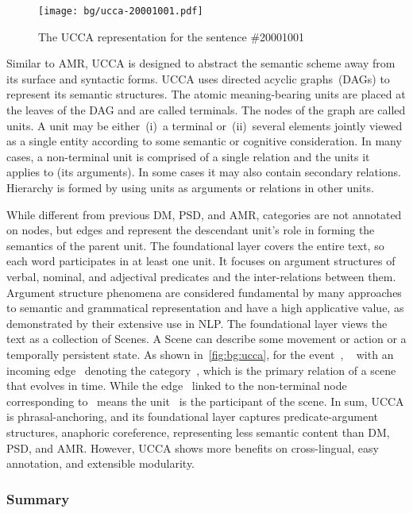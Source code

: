 \begin{figure}[!tbp]
\centering
\texttt{[image: bg/ucca-20001001.pdf]}
\caption{\label{fig:bg:ucca}The UCCA representation for the sentence
  \#20001001}
\end{figure}

Similar to AMR, UCCA is designed to abstract the semantic scheme away
from its surface and syntactic forms. UCCA uses directed acyclic
graphs~(DAGs) to represent its semantic structures. The atomic
meaning-bearing units are placed at the leaves of the DAG and are
called terminals. The nodes of the graph are called units. A unit may
be either~(i)~a terminal or~(ii)~several elements jointly viewed as a
single entity according to some semantic or cognitive
consideration. In many cases, a non-terminal unit is comprised of a
single relation and the units it applies to (its arguments). In some
cases it may also contain secondary relations. Hierarchy is formed by
using units as arguments or relations in other units.

While different from previous DM, PSD, and AMR, categories are not
annotated on nodes, but edges and represent the descendant unit's role
in forming the semantics of the parent unit. The foundational layer
covers the entire text, so each word participates in at least one
unit. It focuses on argument structures of verbal, nominal, and
adjectival predicates and the inter-relations between them. Argument
structure phenomena are considered fundamental by many approaches to
semantic and grammatical representation and have a high applicative
value, as demonstrated by their extensive use in NLP. The foundational
layer views the text as a collection of Scenes. A Scene can describe
some movement or action or a temporally persistent state. As shown
in~\autoref{fig:bg:ucca}, for the event~,
~ with an incoming edge~ denoting the
category~, which is the primary relation of a scene
that evolves in time. While the edge~ linked to the
non-terminal node corresponding to~ means the unit~ is the participant of
the scene. In sum, UCCA is phrasal-anchoring, and its foundational
layer captures predicate-argument structures, anaphoric coreference,
representing less semantic content than DM, PSD, and AMR. However,
UCCA shows more benefits on cross-lingual, easy annotation, and
extensible modularity.

\subsubsection{Summary}
\label{ssec:bg:summary-broad-coverage}

